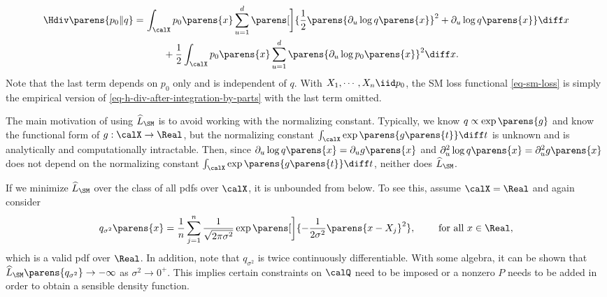 \documentclass[12pt]{article}
\theoremstyle{definition}
\theoremstyle{theorem}
\theoremstyle{remark}
\begin{document}
\begin{align}
	\Hdiv \parens{p_0 \Vert q} = & \, \int_{\calX} p_0 \parens{x} \sum_{u=1}^d \parens[\bigg]{ \frac{1}{2} \parens{\partial_u \log q \parens{x}}^2 +\partial_u \log q \parens{x}} \diff x \nonumber \\ 
	& \qquad + \frac{1}{2} \int_{\calX} p_0 \parens{x} \sum_{u=1}^d \parens{\partial_u \log p_0 \parens{x}}^2 \diff x. \label{eq-h-div-after-integration-by-parts}
\end{align}
Note that the last term depends on $p_0$ only and is independent of $q$. With $X_1, \cdots, X_n \iid p_0$, the SM loss functional \eqref{eq-sm-loss} is simply the empirical version of \eqref{eq-h-div-after-integration-by-parts} with the last term omitted. 

The main motivation of using $\widehat{L}_{\SM}$ is to avoid working with the normalizing constant. Typically, we know $q \propto \exp \parens{g}$ and know the functional form of $g: \calX \to \Real$, but the normalizing constant $\int_{\calX} \exp \parens{g \parens{t}} \diff t$ is unknown and is analytically and computationally intractable. Then, since $\partial_u \log q \parens{x} = \partial_u g \parens{x}$ and $\partial_u^2 \log q \parens{x} = \partial_u^2 g \parens{x}$ does not depend on the normalizing constant $\int_{\calX} \exp \parens{g \parens{t}} \diff t$, neither does $\widehat{L}_{\SM}$. 

If we minimize $\widehat{L}_{\SM}$ over the class of all pdfs over $\calX$, it is unbounded from below. To see this, assume $\calX = \Real$ and again consider 
\begin{align*}
	q_{\sigma^2} \parens{x} = \frac{1}{n} \sum_{j=1}^n \frac{1}{\sqrt{2 \pi \sigma^2}} \exp \parens[\bigg]{-\frac{1}{2\sigma^2} \parens{x - X_j}^2}, \qquad \text{ for all } x \in \Real, 
\end{align*}
which is a valid pdf over $\Real$. In addition, note that $q_{\sigma^2}$ is twice continuously differentiable. With some algebra, it can be shown that $\widehat{L}_{\SM} \parens{q_{\sigma^2}} \to -\infty$ as $\sigma^2 \to 0^+$. This implies certain constraints on $\calQ$ need to be imposed or a nonzero $P$ needs to be added in order to obtain a sensible density function. 
\end{document}

